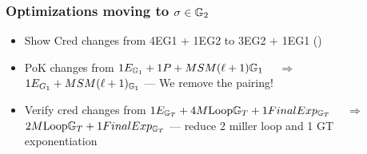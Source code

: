 \subsubsection{Optimizations moving to $\sigma \in \mathbb{G}_2$}
\begin{itemize}
    \item Show Cred changes from 4EG1 + 1EG2 to 3EG2 + 1EG1 ()
    \item PoK changes from $1E_{\mathbb{G}_1} + 1P + MSM(\ell + 1)\mathbb{G}_1$ $\quad \Rightarrow \quad$ $ 1E_{G_1} +MSM(\ell + 1)_{\mathbb{G}_1}$ --- We remove the pairing!
    \item Verify cred changes from $1E_{\mathbb{G}_T} + 4M\text{Loop}\mathbb{G}_T + 1FinalExp_{\mathbb{G}_T}$ $\quad \Rightarrow \quad$ $2M\text{Loop}\mathbb{G}_T + 1FinalExp_{\mathbb{G}_T}$ --- reduce 2 miller loop and 1 GT exponentiation
\end{itemize}
